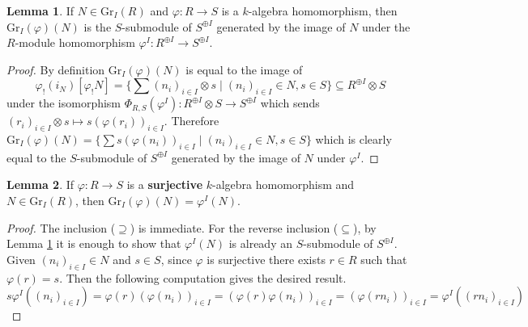\documentclass[oneside,11pt]{amsart}
\newcommand{\Gr}{\ensuremath{\text{Gr}}}
\theoremstyle{definition}
\newtheorem{proof techniques}{Proof Techniques}
\newtheorem{lemma}{Lemma}
\begin{document}


\begin{lemma} \label{lem: equivalent definitions of gr}
If $N \in \Gr_I(R)$ and $\varphi: R \to S$ is a $k$-algebra homomorphism, then $\Gr_I(\varphi)(N)$ is the $S$-submodule of $S^{\oplus I}$ generated by the image of $N$ under the $R$-module homomorphism $\varphi^{I} : R^{\oplus I} \to S^{\oplus I}$. 
\end{lemma}

\begin{proof}
By definition $\Gr_I(\varphi)(N)$ is equal to the image of 
\begin{equation*}
\varphi_!(i_N) [\varphi_! N] = \{ \sum (n_i)_{i \in I} \otimes s \mid (n_i)_{i \in I} \in N , s \in S \} \subseteq R^{\oplus I} \otimes S
\end{equation*} 
under the isomorphism $\Phi_{R , S}(\varphi^I): R^{\oplus I} \otimes S \to S^{\oplus I}$ which sends $(r_i)_{i \in I} \otimes s \mapsto s (\varphi(r_i) )_{i \in I}$. Therefore $\Gr_I(\varphi)(N) = \{ \sum s (\varphi(n_i))_{i \in I} \mid (n_i)_{i \in I} \in N , s \in S \}$ which is clearly equal to the $S$-submodule of $S^{\oplus I}$ generated by the image of $N$ under $\varphi^{I}$. 
\end{proof}



\begin{lemma} \label{lem: surjective homs make image a submodule}
If $\varphi : R \to S$ is a \textbf{surjective} $k$-algebra homomorphism and $N \in \Gr_I(R)$, then $\Gr_I(\varphi)(N) = \varphi^I ( N)$. 
\end{lemma}

\begin{proof}
The inclusion ($\supseteq$) is immediate. For the reverse inclusion ($\subseteq$), by Lemma \ref{lem: equivalent definitions of gr} it is enough to show that $\varphi^I ( N)$ is already an $S$-submodule of $S^{\oplus I}$. Given $(n_i)_{i \in I} \in N$ and $s \in S$, since $\varphi$ is surjective there exists $r \in R$ such that $\varphi(r) = s$. Then the following computation gives the desired result. 
\begin{equation*}
s \varphi^I( (n_i)_{i \in I} ) = \varphi(r) (\varphi(n_i))_{i \in I} =  (\varphi(r) \varphi(n_i))_{i \in I} =  (\varphi(r n_i))_{i \in I} =  \varphi^I ((r n_i)_{i \in I} )
\end{equation*}
\end{proof}
\end{document}
